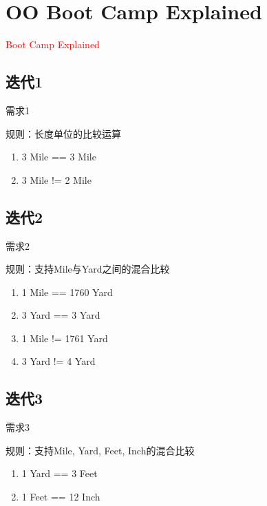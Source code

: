 \section{OO Boot Camp Explained}
\label{sec:oo-camp}

\begin{frame}
  \begin{center}
    \Huge{\textcolor{red}{Boot Camp Explained}}
  \end{center}
\end{frame}

\subsection{迭代1}

\begin{frame}{需求1}
  \begin{block}{规则：长度单位的比较运算}
    \begin{enumerate}
      \item 3 Mile == 3 Mile
      \item 3 Mile != 2 Mile      
    \end{enumerate}
  \end{block}
\end{frame}

\subsection{迭代2}

\begin{frame}{需求2}
  \begin{block}{规则：支持Mile与Yard之间的混合比较}
    \begin{enumerate}
      \item 1 Mile == 1760 Yard
      \item 3 Yard == 3 Yard
      \item 1 Mile != 1761 Yard
      \item 3 Yard != 4 Yard
    \end{enumerate}
  \end{block}
\end{frame}

\subsection{迭代3}

\begin{frame}{需求3}
  \begin{block}{规则：支持Mile, Yard, Feet, Inch的混合比较}
    \begin{enumerate}
      \item 1 Yard == 3 Feet
      \item 1 Feet == 12 Inch
    \end{enumerate}
  \end{block}
\end{frame}

